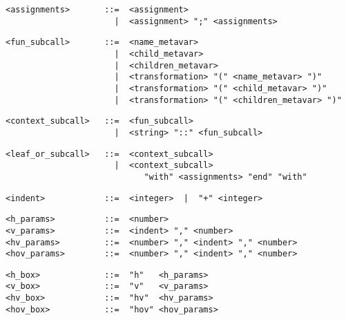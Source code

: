 \begin{small}\begin{verbatim}
<assignments>       ::=  <assignment>
                      |  <assignment> ";" <assignments>
\end{verbatim}\end{small}

\begin{small}\begin{verbatim}
<fun_subcall>       ::=  <name_metavar>
                      |  <child_metavar>
                      |  <children_metavar>
                      |  <transformation> "(" <name_metavar> ")"
                      |  <transformation> "(" <child_metavar> ")"
                      |  <transformation> "(" <children_metavar> ")"
\end{verbatim}\end{small}

\begin{small}\begin{verbatim}
<context_subcall>   ::=  <fun_subcall>
                      |  <string> "::" <fun_subcall>
\end{verbatim}\end{small}

\begin{small}\begin{verbatim}
<leaf_or_subcall>   ::=  <context_subcall>
                      |  <context_subcall>
                            "with" <assignments> "end" "with"
\end{verbatim}\end{small}

\begin{small}\begin{verbatim}
<indent>            ::=  <integer>  |  "+" <integer>
\end{verbatim}\end{small}

\begin{small}\begin{verbatim}
<h_params>          ::=  <number>
<v_params>          ::=  <indent> "," <number>
<hv_params>         ::=  <number> "," <indent> "," <number>
<hov_params>        ::=  <number> "," <indent> "," <number>
\end{verbatim}\end{small}

\begin{small}\begin{verbatim}
<h_box>             ::=  "h"   <h_params>
<v_box>             ::=  "v"   <v_params>
<hv_box>            ::=  "hv"  <hv_params>
<hov_box>           ::=  "hov" <hov_params>
\end{verbatim}\end{small}

